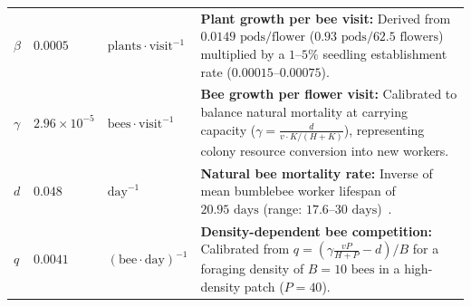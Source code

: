 \documentclass[11pt]{article}
\begin{document}
\begin{table}[htbp]
\begin{tabularx}{\textwidth}{@{} l l l >{\raggedright\arraybackslash}X @{}}
$\beta$ & $0.0005$ & $\text{plants}\cdot\text{visit}^{-1}$ & \textbf{Plant growth per bee visit:} Derived from $0.0149\text{ pods/flower}$ ($0.93\text{ pods} / 62.5\text{ flowers}$)~\cite{woods2012, xerces2018} multiplied by a $1\text{--}5\%$ seedling establishment rate ($0.00015\text{--}0.00075$). \\
$\gamma$ & $2.96 \times 10^{-5}$ & $\text{bees}\cdot\text{visit}^{-1}$ & \textbf{Bee growth per flower visit:} Calibrated to balance natural mortality at carrying capacity ($\gamma = \frac{d}{v \cdot K/(H+K)}$), representing colony resource conversion into new workers. \\
$d$ & $0.048$ & $\text{day}^{-1}$ & \textbf{Natural bee mortality rate:} Inverse of mean bumblebee worker lifespan of $20.95\text{ days}$ (range: $17.6\text{--}30\text{ days}$)~\cite{dasilva2000}. \\
$q$ & $0.0041$ & $(\text{bee}\cdot\text{day})^{-1}$ & \textbf{Density-dependent bee competition:} Calibrated from $q = \left(\gamma \frac{vP}{H+P} - d\right)/B$ for a foraging density of $B=10\text{ bees}$ in a high-density patch ($P=40$). \\
\bottomrule
\end{tabularx}
\end{table}
\end{document}

